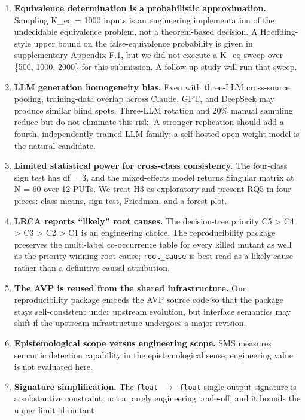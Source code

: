 \documentclass[review,12pt,authoryear]{elsarticle}
\begin{document}
\begin{enumerate}
\item
  \textbf{Equivalence determination is a probabilistic approximation.}
  Sampling K\_eq = 1000 inputs is an engineering implementation of the
  undecidable equivalence problem, not a theorem-based decision. A
  Hoeffding-style upper bound on the false-equivalence probability is
  given in supplementary Appendix F.1, but we did not execute a K\_eq sweep over \{500, 1000, 2000\}
  for this submission. A follow-up study will run that sweep.
\item
  \textbf{LLM generation homogeneity bias.} Even with three-LLM
  cross-source pooling, training-data overlap across Claude, GPT, and
  DeepSeek may produce similar blind spots. Three-LLM rotation and 20\%
  manual sampling reduce but do not eliminate this risk. A stronger
  replication should add a fourth, independently trained LLM family; a
  self-hosted open-weight model is the natural candidate.
\item
  \textbf{Limited statistical power for cross-class consistency.} The
  four-class sign test has df = 3, and the mixed-effects model returns
  Singular matrix at N = 60 over 12 PUTs. We treat H3 as exploratory and
  present RQ5 in four pieces: class means, sign test, Friedman, and a
  forest plot.
\item
  \textbf{LRCA reports ``likely'' root causes.} The decision-tree
  priority C5 \textgreater{} C4 \textgreater{} C3 \textgreater{} C2
  \textgreater{} C1 is an engineering choice. The reproducibility
  package preserves the multi-label co-occurrence table for every killed
  mutant as well as the priority-winning root cause; \texttt{root\_cause}
  is best read as a likely cause rather than a definitive causal
  attribution.
\item
  \textbf{The AVP is reused from the shared infrastructure.} Our reproducibility package
  embeds the AVP source code so that the package stays self-consistent under upstream
  evolution, but interface semantics may shift if the upstream infrastructure undergoes a major
  revision.
\item
  \textbf{Epistemological scope versus engineering scope.} SMS measures
  semantic detection capability in the epistemological sense;
  engineering value is not evaluated here.
\item
  \textbf{Signature simplification.} The \texttt{float\ $\to$\ float}
  single-output signature is a substantive constraint, not a purely
  engineering trade-off, and it bounds the upper limit of mutant

\end{enumerate}
\end{document}
